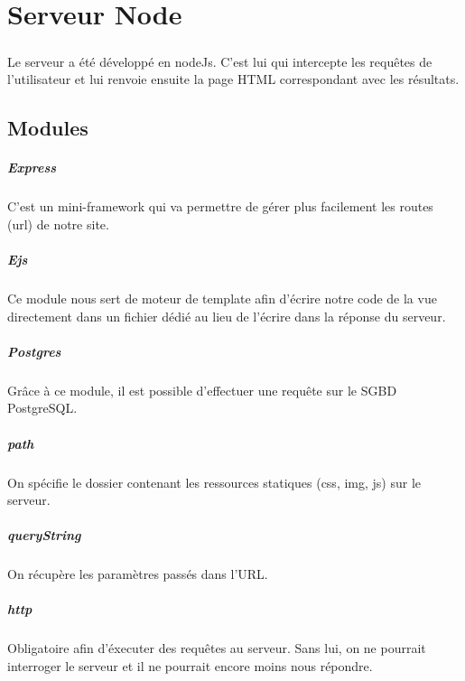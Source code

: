 \documentclass{report}
\begin{document}
\chapter*{Serveur Node}
\thispagestyle{fancy}
	\paragraph{}{
		Le serveur a été développé en nodeJs. C'est lui qui intercepte les requêtes de l'utilisateur et lui renvoie ensuite la page HTML correspondant avec les résultats.
	}

	\section*{Modules}
		\paragraph{Express}{
			C'est un mini-framework qui va permettre de gérer plus facilement les routes (url) de notre site.
		}

		\paragraph{Ejs}{
			Ce module nous sert de moteur de template afin d'écrire notre code de la vue directement dans un fichier dédié au lieu de l'écrire dans la réponse du serveur.
		}


		\paragraph{Postgres}{
			Grâce à ce module, il est possible d'effectuer une requête sur le SGBD PostgreSQL.
		}


		\paragraph{path}{
			On spécifie le dossier contenant les ressources statiques (css, img, js) sur le serveur.
		}

		\paragraph{queryString}{
			On récupère les paramètres passés dans l'URL.
		}

		\paragraph{http}{
			Obligatoire afin d'éxecuter des requêtes au serveur. Sans lui, on ne pourrait interroger le serveur et il ne pourrait encore moins nous répondre.
		}
\end{document}
